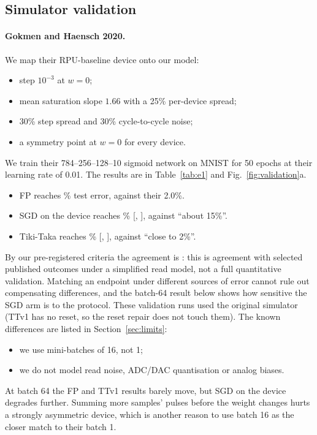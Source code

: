 \subsection{Simulator validation}\label{sec:validation}
\paragraph{Gokmen and Haensch 2020.} We map their RPU-baseline device onto our model:
\begin{itemize}
\item step $10^{-3}$ at $w=0$;
\item mean saturation slope $1.66$ with a 25\% per-device spread;
\item 30\% step spread and 30\% cycle-to-cycle noise;
\item a symmetry point at $w=0$ for every device.
\end{itemize}
We train their 784--256--128--10 sigmoid network on MNIST for 50 epochs at their learning rate of 0.01. The results are in
Table~\ref{tab:e1} and Fig.~\ref{fig:validation}a.
\begin{itemize}
\item FP reaches \REOneFpErr\% test error, against their 2.0\%.
\item SGD on the device reaches \REOneSgdErr\% [\REOneSgdLo, \REOneSgdHi], against ``about 15\%''.
\item Tiki-Taka reaches \REOneTtvOneErr\% [\REOneTtvOneLo, \REOneTtvOneHi], against ``close to 2\%''.
\end{itemize}
By our pre-registered criteria the agreement is \textbf{\REOneVerdict}: this is agreement with selected published outcomes
under a simplified read model, not a full quantitative validation. Matching an endpoint under different sources of error cannot
rule out compensating differences, and the batch-64 result below shows how sensitive the SGD arm is to the protocol. These
validation runs used the original simulator (TTv1 has no reset, so the reset repair does not touch them). The known
differences are listed in Section~\ref{sec:limits}:
\begin{itemize}
\item we use mini-batches of 16, not 1;
\item we do not model read noise, ADC/DAC quantisation or analog biases.
\end{itemize}
At batch 64 the FP and TTv1 results barely move, but SGD on the device degrades further. Summing more samples' pulses before the
weight changes hurts a strongly asymmetric device, which is another reason to use batch 16 as the closer match to their batch 1.

